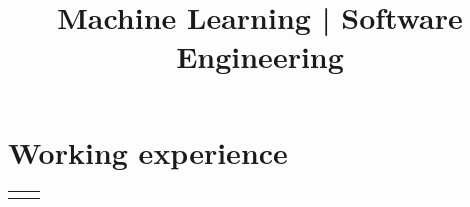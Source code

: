 \documentclass[11pt,a4paper,sans,english]{moderncv}
\title{Machine Learning | Software Engineering}                              %
\makeatletter
\renewcommand*{\cventry}[6][.25em]{%
	\vspace{1.5mm}%
	\begin{tabular*}{\textwidth}{@{\extracolsep{\fill}}ll}%
		\ifthenelse{\equal{#3}{}}{}{\textbf{#3}} &
		\ifthenelse{\equal{#2}{}}{}{#4 #6 #2}\\%
	\end{tabular*}%
	\par\addvspace{#1}}
\makeatother
\begin{document}
	
	\newcommand{\jobdouble}[9]{%
		\cvdoubleitem{#3}{#1, #2, #4}{#7}{#5, #6, #8}
	}
	
	\makecvtitle
	\vspace*{-1cm} %
	\section{Working experience}
	\vspace*{-.15cm}
	\cventry{\textcolor{gray}{\scalebox{0.8}\faCalendar} 01/2025-- current}{Senior Machine Learning Engineer}{\textcolor{gray}{\scalebox{0.8}\faBuilding} \href{https://www.linksmt.it/}{\textit{Links Management \& Technology}} }{}{\textcolor{gray}{\scalebox{0.8}\faMapMarker} Bari }{}
	
\end{document}
